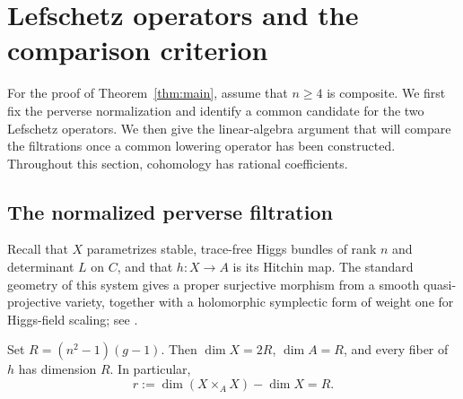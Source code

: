 \section{Lefschetz operators and the comparison criterion}
\label{sec:lefschetz}

For the proof of Theorem~\ref{thm:main}, assume that $n\ge4$ is composite.
We first fix the perverse normalization and identify a common candidate for
the two Lefschetz operators.  We then give the linear-algebra argument that
will compare the filtrations once a common lowering operator has been
constructed.  Throughout this section, cohomology has rational coefficients.

\subsection{The normalized perverse filtration}

Recall that $X$ parametrizes stable, trace-free Higgs bundles of rank $n$
and determinant $L$ on $C$, and that $h:X\to A$ is its Hitchin map.
The standard geometry of this system gives a proper surjective morphism
from a smooth quasi-projective variety, together with a holomorphic
symplectic form of weight one for Higgs-field scaling;
see \cite[Section~1.1]{dCMS2022}.

\begin{lemma}\label{norm:dimensions}
Set $R=(n^2-1)(g-1)$.  Then $\dim X=2R$, $\dim A=R$, and every fiber of
$h$ has dimension $R$.  In particular,
\[
 r:=\dim(X\times_A X)-\dim X=R.
\]
\end{lemma}

